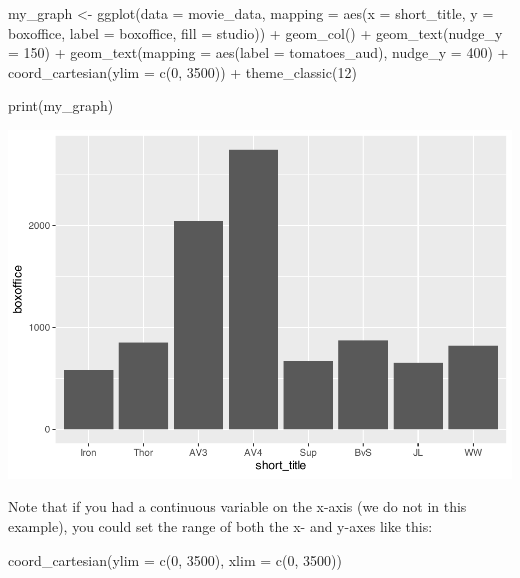 \documentclass[
]{krantz}
\makeatletter
\newenvironment{Shaded}{\begin{snugshade}}{\end{snugshade}}
\newcommand{\AttributeTok}[1]{\textcolor[rgb]{0.61,0.61,0.61}{#1}}
\newcommand{\DecValTok}[1]{\textcolor[rgb]{0.06,0.06,0.06}{#1}}
\newcommand{\FunctionTok}[1]{\textcolor[rgb]{0,0,0}{#1}}
\newcommand{\NormalTok}[1]{#1}
\newcommand{\OtherTok}[1]{\textcolor[rgb]{0.37,0.37,0.37}{#1}}
\newcommand{\SpecialCharTok}[1]{\textcolor[rgb]{0,0,0}{#1}}
\newenvironment{kframe}{%
\medskip{}
\setlength{\fboxsep}{.8em}
 \def\at@end@of@kframe{}%
 \ifinner\ifhmode%
  \def\at@end@of@kframe{\end{minipage}}%
  \begin{minipage}{\columnwidth}%
 \fi\fi%
 \def\FrameCommand##1{\hskip\@totalleftmargin \hskip-\fboxsep
 \colorbox{shadecolor}{##1}\hskip-\fboxsep
     \hskip-\linewidth \hskip-\@totalleftmargin \hskip\columnwidth}%
 \MakeFramed {\advance\hsize-\width
   \@totalleftmargin\z@ \linewidth\hsize
   \@setminipage}}%
 {\par\unskip\endMakeFramed%
 \at@end@of@kframe}
\renewenvironment{Shaded}{\begin{kframe}}{\end{kframe}}
\makeatother
\begin{document}
\begin{Shaded}
\begin{Highlighting}[]
\NormalTok{my\_graph }\OtherTok{\textless{}{-}} \FunctionTok{ggplot}\NormalTok{(}\AttributeTok{data =}\NormalTok{ movie\_data,}
           \AttributeTok{mapping =} \FunctionTok{aes}\NormalTok{(}\AttributeTok{x =}\NormalTok{ short\_title,}
                         \AttributeTok{y =}\NormalTok{ boxoffice,}
                         \AttributeTok{label =}\NormalTok{ boxoffice, }
                         \AttributeTok{fill =}\NormalTok{ studio)) }\SpecialCharTok{+}
  \FunctionTok{geom\_col}\NormalTok{() }\SpecialCharTok{+}
  \FunctionTok{geom\_text}\NormalTok{(}\AttributeTok{nudge\_y =} \DecValTok{150}\NormalTok{)  }\SpecialCharTok{+}
  \FunctionTok{geom\_text}\NormalTok{(}\AttributeTok{mapping =} \FunctionTok{aes}\NormalTok{(}\AttributeTok{label =}\NormalTok{ tomatoes\_aud), }
            \AttributeTok{nudge\_y =} \DecValTok{400}\NormalTok{) }\SpecialCharTok{+}
  \FunctionTok{coord\_cartesian}\NormalTok{(}\AttributeTok{ylim =} \FunctionTok{c}\NormalTok{(}\DecValTok{0}\NormalTok{, }\DecValTok{3500}\NormalTok{)) }\SpecialCharTok{+}
  \FunctionTok{theme\_classic}\NormalTok{(}\DecValTok{12}\NormalTok{)}


\FunctionTok{print}\NormalTok{(my\_graph)}
\end{Highlighting}
\end{Shaded}

\includegraphics[width=0.65\linewidth]{bookdown_files/figure-latex/unnamed-chunk-114-1}

Note that if you had a continuous variable on the x-axis (we do not in this example), you could set the range of both the x- and y-axes like this:

\begin{Shaded}
\begin{Highlighting}[]
\FunctionTok{coord\_cartesian}\NormalTok{(}\AttributeTok{ylim =} \FunctionTok{c}\NormalTok{(}\DecValTok{0}\NormalTok{, }\DecValTok{3500}\NormalTok{),}
                \AttributeTok{xlim =} \FunctionTok{c}\NormalTok{(}\DecValTok{0}\NormalTok{, }\DecValTok{3500}\NormalTok{))}
\end{Highlighting}
\end{Shaded}
\end{document}
